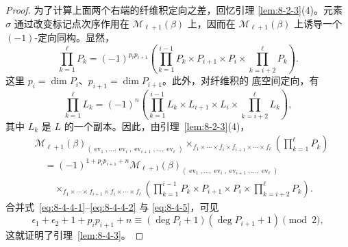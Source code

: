 \begin{proof}
为了计算上面两个右端的纤维积定向之差，回忆引理
\ref{lem:8-2-3}(4)。元素 $\sigma$ 通过改变标记点次序作用在
$\mathcal M_{\ell+1}(\beta)$ 上，因而在
$\mathcal M_{\ell+1}(\beta)$ 上诱导一个 $(-1)$-定向同构。显然，
\[
 \prod_{k=1}^{\ell}P_k
 =(-1)^{p_ip_{i+1}}
 \left(
  \prod_{k=1}^{i-1}P_k\times P_{i+1}\times P_i
  \times\prod_{k=i+2}^{\ell}P_k
 \right).
\]
这里 $p_i=\dim P_i$、$p_{i+1}=\dim P_{i+1}$。此外，对纤维积的
底空间定向，有
\[
 \prod_{k=1}^{\ell}L_k
 =(-1)^n
 \left(
  \prod_{k=1}^{i-1}L_k\times L_{i+1}\times L_i
  \times\prod_{k=i+2}^{\ell}L_k
 \right),
\]
其中 $L_k$ 是 $L$ 的一个副本。因此，由引理~\ref{lem:8-2-3}(4)，
\begin{equation}
\begin{aligned}
 &\mathcal M_{\ell+1}(\beta)_{
 (\operatorname{ev}_1,\ldots,
  \operatorname{ev}_i,\operatorname{ev}_{i+1},\ldots,
  \operatorname{ev}_\ell)}
 \mathop{\times}_{
 f_1\times\cdots\times f_i\times f_{i+1}\times\cdots\times f_\ell}
 \left(\prod_{k=1}^{\ell}P_k\right)\\
 &\quad={}
 (-1)^{1+p_ip_{i+1}+n}
 \mathcal M_{\ell+1}(\beta)_{
 (\operatorname{ev}_1,\ldots,
  \operatorname{ev}_i,\operatorname{ev}_{i+1},\ldots,
  \operatorname{ev}_\ell)}\\[-2pt]
 &\qquad{}\mathop{\times}_{
 f_1\times\cdots\times f_{i+1}\times f_i\times\cdots\times f_\ell}
 \left(
  \prod_{k=1}^{i-1}P_k\times P_{i+1}\times P_i
  \times\prod_{k=i+2}^{\ell}P_k
 \right).
\end{aligned}
\tag{8.4.5}\label{eq:8-4-5}
\end{equation}
合并式~\eqref{eq:8-4-4-1}--\eqref{eq:8-4-4-2} 与
\eqref{eq:8-4-5}，可见
\[
 \epsilon_1+\epsilon_2+1+p_ip_{i+1}+n
 \equiv(\deg P_i+1)(\deg P_{i+1}+1)\pmod2,
\]
这就证明了引理~\ref{lem:8-4-3}。
\end{proof}
